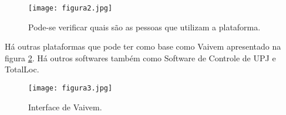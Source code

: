\begin{figure}[!h]
	\centering
	\caption{Pode-se verificar quais são as pessoas que utilizam a plataforma.}
	\texttt{[image: figura2.jpg]}
	\label{fig:Lend-Itens2}
\end{figure}

Há outras plataformas que pode ter como base como Vaivem apresentado na figura \ref{fig:Vaivem}. Há outros softwares também como Software de Controle de UPJ e TotalLoc.

\begin{figure}[!h]
	\centering
	\caption{Interface de Vaivem.}
	\texttt{[image: figura3.jpg]}
	\label{fig:Vaivem}
\end{figure}

